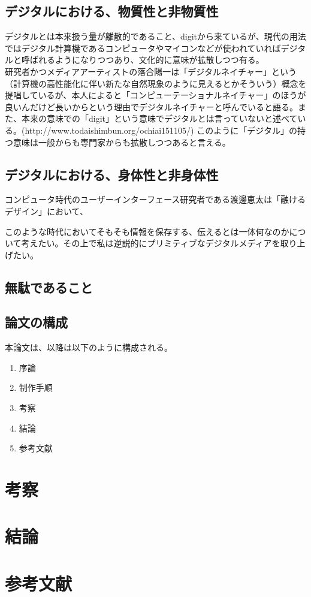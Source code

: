 \subsection{デジタルにおける、物質性と非物質性}\label{ux30c7ux30b8ux30bfux30ebux306bux304aux3051ux308bux7269ux8ceaux6027ux3068ux975eux7269ux8ceaux6027}

デジタルとは本来扱う量が離散的であること、digitから来ているが、現代の用法ではデジタル計算機であるコンピュータやマイコンなどが使われていればデジタルと呼ばれるようになりつつあり、文化的に意味が拡散しつつ有る。\\
研究者かつメディアアーティストの落合陽一は「デジタルネイチャー」という（計算機の高性能化に伴い新たな自然現象のように見えるとかそういう）概念を提唱しているが、本人によると「コンピューテーショナルネイチャー」のほうが良いんだけど長いからという理由でデジタルネイチャーと呼んでいると語る。また、本来の意味での「digit」という意味でデジタルとは言っていないと述べている。(http://www.todaishimbun.org/ochiai151105/)
このように「デジタル」の持つ意味は一般からも専門家からも拡散しつつあると言える。

\subsection{デジタルにおける、身体性と非身体性}\label{ux30c7ux30b8ux30bfux30ebux306bux304aux3051ux308bux8eabux4f53ux6027ux3068ux975eux8eabux4f53ux6027}

コンピュータ時代のユーザーインターフェース研究者である渡邊恵太は「融けるデザイン」において、

このような時代においてそもそも情報を保存する、伝えるとは一体何なのかについて考えたい。その上で私は逆説的にプリミティブなデジタルメディアを取り上げたい。

\subsection{無駄であること}\label{ux7121ux99c4ux3067ux3042ux308bux3053ux3068}

\subsection{論文の構成}\label{ux8ad6ux6587ux306eux69cbux6210}

本論文は、以降は以下のように構成される。

\begin{enumerate}
\def\labelenumi{\arabic{enumi}.}
\tightlist
\item
  序論
\item
  制作手順
\item
  考察
\item
  結論
\item
  参考文献
\end{enumerate}

\section{考察}\label{ux8003ux5bdf}

\section{結論}\label{ux7d50ux8ad6}

\section{参考文献}\label{ux53c2ux8003ux6587ux732e}
